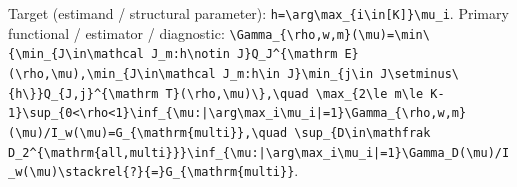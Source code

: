 \documentclass{article}
\begin{document}
Target (estimand / structural parameter): \texttt{h=\allowbreak{}\textbackslash{}\allowbreak{}arg\textbackslash{}\allowbreak{}max\_\allowbreak{}\{i\textbackslash{}\allowbreak{}in[K]\}\allowbreak{}\textbackslash{}\allowbreak{}mu\_\allowbreak{}i}.
Primary functional / estimator / diagnostic: \texttt{\textbackslash{}\allowbreak{}Gamma\_\allowbreak{}\{\textbackslash{}\allowbreak{}rho,\allowbreak{}w,\allowbreak{}m\}\allowbreak{}(\textbackslash{}\allowbreak{}mu)=\allowbreak{}\textbackslash{}\allowbreak{}min\textbackslash{}\allowbreak{}\{\textbackslash{}\allowbreak{}min\_\allowbreak{}\{J\textbackslash{}\allowbreak{}in\textbackslash{}\allowbreak{}mathcal J\_\allowbreak{}m:\allowbreak{}h\textbackslash{}\allowbreak{}notin J\}\allowbreak{}Q\_\allowbreak{}J\textasciicircum{}\{\textbackslash{}\allowbreak{}mathrm E\}\allowbreak{}(\textbackslash{}\allowbreak{}rho,\allowbreak{}\textbackslash{}\allowbreak{}mu),\allowbreak{}\textbackslash{}\allowbreak{}min\_\allowbreak{}\{J\textbackslash{}\allowbreak{}in\textbackslash{}\allowbreak{}mathcal J\_\allowbreak{}m:\allowbreak{}h\textbackslash{}\allowbreak{}in J\}\allowbreak{}\textbackslash{}\allowbreak{}min\_\allowbreak{}\{j\textbackslash{}\allowbreak{}in J\textbackslash{}\allowbreak{}setminus\textbackslash{}\allowbreak{}\{h\textbackslash{}\allowbreak{}\}\allowbreak{}\}\allowbreak{}Q\_\allowbreak{}\{J,\allowbreak{}j\}\allowbreak{}\textasciicircum{}\{\textbackslash{}\allowbreak{}mathrm T\}\allowbreak{}(\textbackslash{}\allowbreak{}rho,\allowbreak{}\textbackslash{}\allowbreak{}mu)\textbackslash{}\allowbreak{}\}\allowbreak{},\allowbreak{}\textbackslash{}\allowbreak{}quad \textbackslash{}\allowbreak{}max\_\allowbreak{}\{2\textbackslash{}\allowbreak{}le m\textbackslash{}\allowbreak{}le K-\allowbreak{}1\}\allowbreak{}\textbackslash{}\allowbreak{}sup\_\allowbreak{}\{0<\textbackslash{}\allowbreak{}rho<1\}\allowbreak{}\textbackslash{}\allowbreak{}inf\_\allowbreak{}\{\textbackslash{}\allowbreak{}mu:\allowbreak{}|\textbackslash{}\allowbreak{}arg\textbackslash{}\allowbreak{}max\_\allowbreak{}i\textbackslash{}\allowbreak{}mu\_\allowbreak{}i|=\allowbreak{}1\}\allowbreak{}\textbackslash{}\allowbreak{}Gamma\_\allowbreak{}\{\textbackslash{}\allowbreak{}rho,\allowbreak{}w,\allowbreak{}m\}\allowbreak{}(\textbackslash{}\allowbreak{}mu)/\allowbreak{}I\_\allowbreak{}w(\textbackslash{}\allowbreak{}mu)=\allowbreak{}G\_\allowbreak{}\{\textbackslash{}\allowbreak{}mathrm\{multi\}\allowbreak{}\}\allowbreak{},\allowbreak{}\textbackslash{}\allowbreak{}quad \textbackslash{}\allowbreak{}sup\_\allowbreak{}\{D\textbackslash{}\allowbreak{}in\textbackslash{}\allowbreak{}mathfrak D\_\allowbreak{}2\textasciicircum{}\{\textbackslash{}\allowbreak{}mathrm\{all,\allowbreak{}multi\}\allowbreak{}\}\allowbreak{}\}\allowbreak{}\textbackslash{}\allowbreak{}inf\_\allowbreak{}\{\textbackslash{}\allowbreak{}mu:\allowbreak{}|\textbackslash{}\allowbreak{}arg\textbackslash{}\allowbreak{}max\_\allowbreak{}i\textbackslash{}\allowbreak{}mu\_\allowbreak{}i|=\allowbreak{}1\}\allowbreak{}\textbackslash{}\allowbreak{}Gamma\_\allowbreak{}D(\textbackslash{}\allowbreak{}mu)/\allowbreak{}I\_\allowbreak{}w(\textbackslash{}\allowbreak{}mu)\textbackslash{}\allowbreak{}stackrel\{?\}\allowbreak{}\{=\allowbreak{}\}\allowbreak{}G\_\allowbreak{}\{\textbackslash{}\allowbreak{}mathrm\{multi\}\allowbreak{}\}\allowbreak{}}.
\end{document}
